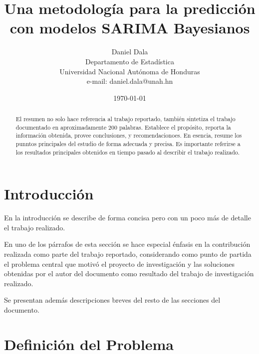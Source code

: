 \documentclass[peerreview]{IEEEtran}
\begin{document}
\title{Una metodología para la predicción con modelos SARIMA Bayesianos}


\author{Daniel Dala\\
Departamento de Estadística\\
Universidad Nacional Aut\'onoma de Honduras\\
e-mail: daniel.dala@unah.hn
}
\date{\today}

\maketitle
\tableofcontents
\listoffigures
\listoftables

\IEEEpeerreviewmaketitle
\begin{abstract}
El resumen no solo hace referencia al trabajo reportado, tambi\'en sintetiza el trabajo documentado en aproximadamente 200 palabras. Establece el prop\'osito, reporta la informaci\'on obtenida, provee conclusiones, y recomendacionoes. En esencia, resume los punntos principales del estudio de forma adecuada y precisa. Es importante referirse a los resultados principales obtenidos en tiempo pasado al describir el trabajo realizado.
\end{abstract}

\section{Introducci\'on}

En la introducci\'on se describe de forma concisa pero con un poco m\'as de detalle el trabajo realizado.

En uno de los p\'arrafos de esta secci\'on se hace especial \'enfasis en la contribuci\'on realizada como parte del trabajo reportado, considerando como punto de partida el problema central que motiv\'o el proyecto de investigaci\'on y las soluciones obtenidas por el autor del documento como resultado del trabajo de investigaci\'on realizado.

Se presentan adem\'as descripciones breves del resto de las secciones del documento.


\section{Definici\'on del Problema}
\end{document}
